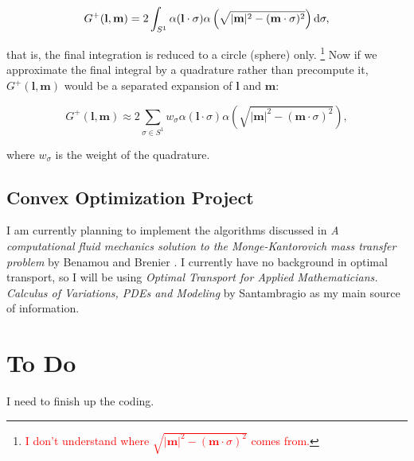 \documentclass{article}
\def\t{\text}
\def\b{\mathbf}
\begin{document}
\[
    G^+(\b l, \b m) = 2 \int_{S^1} \alpha( \b l \cdot \sigma) \alpha \left( \sqrt{|\b m|^2 - (\b m \cdot \sigma)^2} \right) \t d \sigma,
\]

that is, the final integration is reduced to a circle (sphere) only. \footnote{\textcolor{red}{I don't understand where $\sqrt{|\b m|^2 - (\b m \cdot \sigma)^2}$ comes from.}} Now if we approximate
the final integral by a quadrature rather than precompute it, $G^+(\b l, \b m)$ would be a
separated expansion of $\b l$ and $\b m$:

\[
    G^+(\b l, \b m) \approx 2 \sum_{\sigma \in S^1} w_{\sigma} \alpha( \b l \cdot \sigma) \alpha \left( \sqrt{|\b m|^2 - (\b m \cdot \sigma)^2} \right),
\]

where $w_\sigma$ is the weight of the quadrature.

\subsection{Convex Optimization Project}

I am currently planning to implement the algorithms discussed in \textit{A computational fluid mechanics solution to the Monge-Kantorovich mass transfer problem} by Benamou and Brenier \cite{BenamouB00}. I currently have no background in optimal transport, so I will be using \textit{Optimal Transport for Applied Mathematicians. Calculus of Variations, PDEs and Modeling} by Santambragio \cite{noauthororeditor} as my main source of information.

\section{To Do}

I need to finish up the coding.



\end{document}
